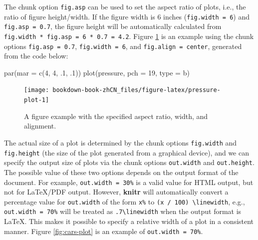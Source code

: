 \documentclass[
  12pt,
]{krantz}
\newenvironment{Shaded}{\begin{snugshade}}{\end{snugshade}}
\newcommand{\AttributeTok}[1]{\textcolor[rgb]{0.77,0.63,0.00}{#1}}
\newcommand{\DecValTok}[1]{\textcolor[rgb]{0.00,0.00,0.81}{#1}}
\newcommand{\FunctionTok}[1]{\textcolor[rgb]{0.00,0.00,0.00}{#1}}
\newcommand{\NormalTok}[1]{#1}
\newcommand{\StringTok}[1]{\textcolor[rgb]{0.31,0.60,0.02}{#1}}
\theoremstyle{definition}
\theoremstyle{definition}
\theoremstyle{definition}
\theoremstyle{definition}
\theoremstyle{remark}
\begin{document}
The chunk option \texttt{fig.asp} can be used to set the aspect ratio of plots, i.e., the ratio of figure height/width. If the figure width is 6 inches (\texttt{fig.width\ =\ 6}) and \texttt{fig.asp\ =\ 0.7}, the figure height will be automatically calculated from \texttt{fig.width\ *\ fig.asp\ =\ 6\ *\ 0.7\ =\ 4.2}. Figure \ref{fig:pressure-plot} is an example using the chunk options \texttt{fig.asp\ =\ 0.7}, \texttt{fig.width\ =\ 6}, and \texttt{fig.align\ =\ \textquotesingle{}center\textquotesingle{}}, generated from the code below:

\begin{Shaded}
\begin{Highlighting}[]
\FunctionTok{par}\NormalTok{(}\AttributeTok{mar =} \FunctionTok{c}\NormalTok{(}\DecValTok{4}\NormalTok{, }\DecValTok{4}\NormalTok{, .}\DecValTok{1}\NormalTok{, .}\DecValTok{1}\NormalTok{))}
\FunctionTok{plot}\NormalTok{(pressure, }\AttributeTok{pch =} \DecValTok{19}\NormalTok{, }\AttributeTok{type =} \StringTok{\textquotesingle{}b\textquotesingle{}}\NormalTok{)}
\end{Highlighting}
\end{Shaded}

\begin{figure}

{\centering \texttt{[image: bookdown-book-zhCN\_files/figure-latex/pressure-plot-1]} 

}

\caption{A figure example with the specified aspect ratio, width, and alignment.}\label{fig:pressure-plot}
\end{figure}

The actual size of a plot is determined by the chunk options \texttt{fig.width} and \texttt{fig.height} (the size of the plot generated from a graphical device), and we can specify the output size of plots via the chunk options \texttt{out.width} and \texttt{out.height}. The possible value of these two options depends on the output format of the document. For example, \texttt{out.width\ =\ \textquotesingle{}30\%\textquotesingle{}} is a valid value for HTML output, but not for LaTeX/PDF output. However, \textbf{knitr} will automatically convert a percentage value for \texttt{out.width} of the form \texttt{x\%} to \texttt{(x\ /\ 100)\ \textbackslash{}linewidth}, e.g., \texttt{out.width\ =\ \textquotesingle{}70\%\textquotesingle{}} will be treated as \texttt{.7\textbackslash{}linewidth} when the output format is LaTeX. This makes it possible to specify a relative width of a plot in a consistent manner. Figure \ref{fig:cars-plot} is an example of \texttt{out.width\ =\ 70\%}.
\end{document}
